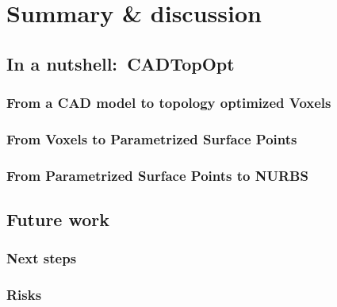 \chapter{Summary \& discussion}
\label{chapter:Discussion}
\section{In a nutshell:\ \acl{CADTopOpt}}
\subsection{From a \acs{CAD} model to topology optimized Voxels}
\subsection{From Voxels to Parametrized Surface Points}
\subsection{From Parametrized Surface Points to \ac{NURBS}}

\section{Future work}

\subsection{Next steps}
\subsection{Risks}

